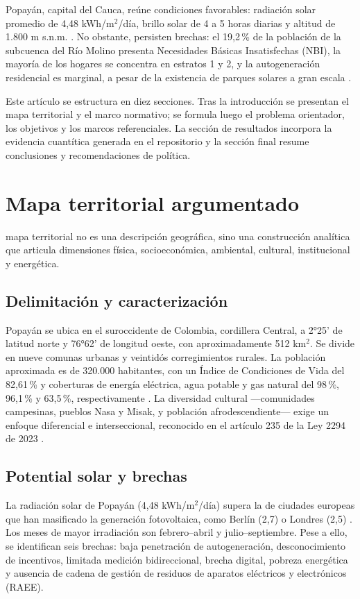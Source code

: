 \documentclass[journal]{IEEEtran}
\begin{document}
Popayán, capital del Cauca, reúne condiciones favorables: radiación solar promedio de 4,48 kWh/m$^2$/día, brillo solar de 4 a 5 horas diarias y altitud de 1.800 m s.n.m. \cite{r14}. No obstante, persisten brechas: el 19,2\,\% de la población de la subcuenca del Río Molino presenta Necesidades Básicas Insatisfechas (NBI), la mayoría de los hogares se concentra en estratos 1 y 2, y la autogeneración residencial es marginal, a pesar de la existencia de parques solares a gran escala \cite{r13,r15}.

Este artículo se estructura en diez secciones. Tras la introducción se presentan el mapa territorial y el marco normativo; se formula luego el problema orientador, los objetivos y los marcos referenciales. La sección de resultados incorpora la evidencia cuantítica generada en el repositorio y la sección final resume conclusiones y recomendaciones de política.

\section{Mapa territorial argumentado}
 mapa territorial no es una descripción geográfica, sino una construcción analítica que articula dimensiones física, socioeconómica, ambiental, cultural, institucional y energética.

\subsection{Delimitación y caracterización}
Popayán se ubica en el suroccidente de Colombia, cordillera Central, a 2°25' de latitud norte y 76°62' de longitud oeste, con aproximadamente 512 km$^2$. Se divide en nueve comunas urbanas y veintidós corregimientos rurales. La población aproximada es de 320.000 habitantes, con un Índice de Condiciones de Vida del 82,61\,\% y coberturas de energía eléctrica, agua potable y gas natural del 98\,\%, 96,1\,\% y 63,5\,\%, respectivamente \cite{r13}. La diversidad cultural ---comunidades campesinas, pueblos Nasa y Misak, y población afrodescendiente--- exige un enfoque diferencial e interseccional, reconocido en el artículo 235 de la Ley 2294 de 2023 \cite{r4}.

\subsection{Potential solar y brechas}
La radiación solar de Popayán (4,48 kWh/m$^2$/día) supera la de ciudades europeas que han masificado la generación fotovoltaica, como Berlín (2,7) o Londres (2,5) \cite{r14}. Los meses de mayor irradiación son febrero--abril y julio--septiembre. Pese a ello, se identifican seis brechas: baja penetración de autogeneración, desconocimiento de incentivos, limitada medición bidireccional, brecha digital, pobreza energética y ausencia de cadena de gestión de residuos de aparatos eléctricos y electrónicos (RAEE).
\end{document}
